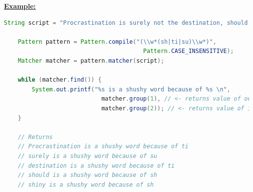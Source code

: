\documentclass[12pt]{article}
\begin{document}
\begin{itemize}
    \bigskip

    \underline{\textbf{Example:}}

    \bigskip

    \begin{lstlisting}[language=Java, caption={demo/Explore3.java}]
    String script = "Procrastination is surely not the destination, should we talk about shiny things?";

    Pattern pattern = Pattern.compile("(\\w*(sh|ti|su)\\w*)",
                                        Pattern.CASE_INSENSITIVE);
    Matcher matcher = pattern.matcher(script);

    while (matcher.find()) {
        System.out.printf("%s is a shushy word because of %s \n",
                            matcher.group(1), // <- returns value of outer parenthesis
                            matcher.group(2)); // <- returns value of inner parenthesis
    }

    // Returns
    // Procrastination is a shushy word because of ti
    // surely is a shushy word because of su
    // destination is a shushy word because of ti
    // should is a shushy word because of sh
    // shiny is a shushy word because of sh
    \end{lstlisting}

\end{itemize}
\end{document}
